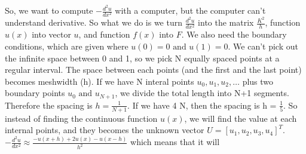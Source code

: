 So, we want to compute \(-\frac{d^2 u}{dx^2}\) with a computer, but the computer can't understand derivative. 
So what we do is we turn \(\frac{d^2 u}{dx^2}\)  into the matrix \(\frac{K^2}{h}\),
function \(u(x)\)  into vector \(u\), and function \(f(x)\) into \(F\).
We also need the boundary conditions, which are given where \(u(0) = 0 \text{ and } u(1)=0\). 
We can't pick out the infinite space between 0 and 1, so we pick N equally spaced points at a regular interval. 
The space between each points (and the first and the last point) becomes meshwidth (h). 
If we have N interal points \(u_0, u_1, u_2, \ldots\) plus two boundary points \(u_0 \text{ and } u_{N+1}\), we divide the total length into N+1 segments.
Therefore the spacing is \(h = \frac{1}{N+1}\).
If we have 4 N, then the spacing is h = \(\frac{1}{5}\).
So instead of finding the continuous function \(u(x)\), we will find the value at each internal points, and they becomes the unknown vector \(U = [u_1, u_2, u_3, u_4]^T\).
\medbreak
\(-\frac{d^2 u}{dx^2} \approx  \frac{-u(x+h) + 2u(x) - u(x-h)}{h^2}\) which means that it will
